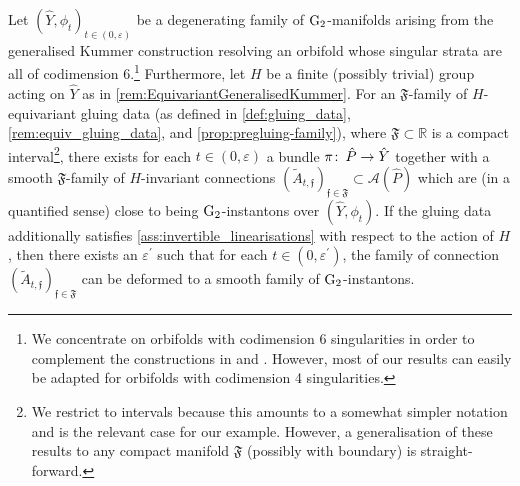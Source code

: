 \documentclass[11pt,a4paper]{scrartcl}
\newcommand{\col}{\colon \thinspace}
\newcommand{\G}{\textup{G}}
\numberwithin{equation}{section}
\theoremstyle{plain}
\theoremstyle{definition}
\theoremstyle{remark}
\begin{document}
\begin{introtheorem}\label{introthm:G2-instantons-existence} 
Let $(\hat{Y},\phi_t)_{t\in (0,\varepsilon)}$ be a degenerating family of $\G_2$-manifolds arising from the generalised Kummer construction resolving an orbifold whose singular strata are all of codimension 6.\footnote{We concentrate on orbifolds with codimension 6 singularities in order to complement the constructions in \cite{Walpuski-InstantonsKummer} and \cite{Platt-G2Instantons}. However, most of our results can easily be adapted for orbifolds with codimension 4 singularities.} Furthermore, let $H$ be a finite (possibly trivial) group acting on $\hat{Y}$ as in \autoref{rem:EquivariantGeneralisedKummer}. For an $\mathfrak{F}$-family of $H$-equivariant gluing data (as defined in \autoref{def:gluing_data}, \autoref{rem:equiv_gluing_data}, and \autoref{prop:pregluing-family}), where $\mathfrak{F}\subset \mathbb{R}$ is a compact interval\footnote{We restrict to intervals because this amounts to a somewhat simpler notation and is the relevant case for our example. However, a generalisation of these results to any compact manifold $\mathfrak{F}$ (possibly with boundary) is straight-forward.}, there exists for each $t\in (0,\varepsilon)$ a bundle $\pi \col \hat{P} \to \hat{Y}$ together with a smooth $\mathfrak{F}$-family of $H$-invariant connections $(\tilde{A}_{t,\mathfrak{f}})_{\mathfrak{f}\in \mathfrak{F}} \subset \mathcal{A}(\hat{P})$ which are (in a quantified sense) close to being $\G_2$-instantons over $(\hat{Y},\phi_t)$. If the gluing data additionally satisfies \autoref{ass:invertible_linearisations} with respect to the action of $H$, then there exists an $\varepsilon^\prime$ such that for each $t\in (0,\varepsilon^\prime)$, the family of connection $(\tilde{A}_{t,\mathfrak{f}})_{\mathfrak{f}\in \mathfrak{F}}$ can be deformed to a smooth family of $\G_2$-instantons.
\end{introtheorem}
\end{document}

